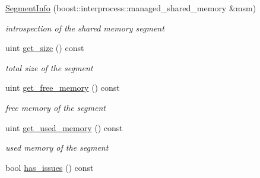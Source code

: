 \begin{DoxyCompactItemize}
\item 
\mbox{\label{classshared__memory_1_1SegmentInfo_a254ed3b9d7e7e69a6888c9927504fe3b}} 
\hyperlink{classshared__memory_1_1SegmentInfo_a254ed3b9d7e7e69a6888c9927504fe3b}{Segment\+Info} (boost\+::interprocess\+::managed\+\_\+shared\+\_\+memory \&msm)
\begin{DoxyCompactList}\small\item\em introspection of the shared memory segment \end{DoxyCompactList}\item 
\mbox{\label{classshared__memory_1_1SegmentInfo_a10bc7f1530dcc602d12e42ddc222cdbe}} 
uint \hyperlink{classshared__memory_1_1SegmentInfo_a10bc7f1530dcc602d12e42ddc222cdbe}{get\+\_\+size} () const
\begin{DoxyCompactList}\small\item\em total size of the segment \end{DoxyCompactList}\item 
\mbox{\label{classshared__memory_1_1SegmentInfo_a07049110a3ef9a082147b57b51111a7a}} 
uint \hyperlink{classshared__memory_1_1SegmentInfo_a07049110a3ef9a082147b57b51111a7a}{get\+\_\+free\+\_\+memory} () const
\begin{DoxyCompactList}\small\item\em free memory of the segment \end{DoxyCompactList}\item 
\mbox{\label{classshared__memory_1_1SegmentInfo_a165763fcbc24aa2b39beb837678e2c4f}} 
uint \hyperlink{classshared__memory_1_1SegmentInfo_a165763fcbc24aa2b39beb837678e2c4f}{get\+\_\+used\+\_\+memory} () const
\begin{DoxyCompactList}\small\item\em used memory of the segment \end{DoxyCompactList}\item 
\mbox{\label{classshared__memory_1_1SegmentInfo_abd146588f1eba17af6d53d351bc3e02d}} 
bool \hyperlink{classshared__memory_1_1SegmentInfo_abd146588f1eba17af6d53d351bc3e02d}{has\+\_\+issues} () const

\end{DoxyCompactItemize}
